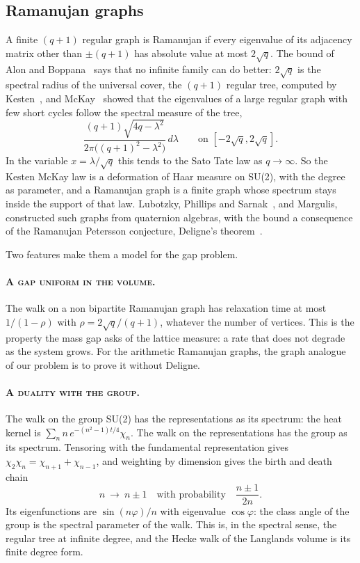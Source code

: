 \subsection{Ramanujan graphs}

A finite $(q+1)$ regular graph is Ramanujan if every eigenvalue of its adjacency matrix other than $\pm(q+1)$ has absolute value at most $2\sqrt q$. The bound of Alon and Boppana~\cite{Al86} says that no infinite family can do better: $2\sqrt q$ is the spectral radius of the universal cover, the $(q+1)$ regular tree, computed by Kesten~\cite{Kes59}, and McKay~\cite{McK81} showed that the eigenvalues of a large regular graph with few short cycles follow the spectral measure of the tree,
\[
\frac{(q+1)\sqrt{4q-\lambda^2}}{2\pi\big((q+1)^2-\lambda^2\big)}\,d\lambda\qquad\text{on }[-2\sqrt q,2\sqrt q].
\]
In the variable $x=\lambda/\sqrt q$ this tends to the Sato Tate law as $q\to\infty$. So the Kesten McKay law is a deformation of Haar measure on SU(2), with the degree as parameter, and a Ramanujan graph is a finite graph whose spectrum stays inside the support of that law. Lubotzky, Phillips and Sarnak~\cite{LPS88}, and Margulis, constructed such graphs from quaternion algebras, with the bound a consequence of the Ramanujan Petersson conjecture, Deligne's theorem~\cite{De74}.

Two features make them a model for the gap problem.

\paragraph{\normalfont\scshape A gap uniform in the volume.} The walk on a non bipartite Ramanujan graph has relaxation time at most $1/(1-\rho)$ with $\rho=2\sqrt q/(q+1)$, whatever the number of vertices. This is the property the mass gap asks of the lattice measure: a rate that does not degrade as the system grows. For the arithmetic Ramanujan graphs, the graph analogue of our problem is to prove it without Deligne.

\paragraph{\normalfont\scshape A duality with the group.} The walk on the group SU(2) has the representations as its spectrum: the heat kernel is $\sum_nn\,e^{-(n^2-1)t/4}\chi_n$. The walk on the representations has the group as its spectrum. Tensoring with the fundamental representation gives $\chi_2\chi_n=\chi_{n+1}+\chi_{n-1}$, and weighting by dimension gives the birth and death chain
\[
n\ \longrightarrow\ n\pm1\quad\text{with probability}\quad\frac{n\pm1}{2n}.
\]
Its eigenfunctions are $\sin(n\varphi)/n$ with eigenvalue $\cos\varphi$: the class angle of the group is the spectral parameter of the walk. This is, in the spectral sense, the regular tree at infinite degree, and the Hecke walk of the Langlands volume is its finite degree form.


